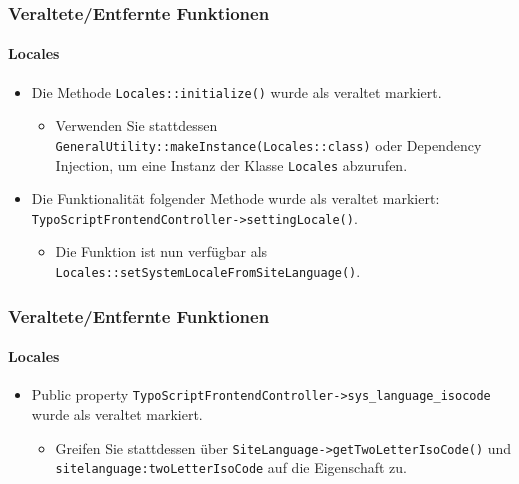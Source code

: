 \begin{frame}[fragile]
	\frametitle{Veraltete/Entfernte Funktionen}
	\framesubtitle{Locales}

	\begin{itemize}
		\item Die Methode \texttt{Locales::initialize()} wurde als veraltet markiert.

			\begin{itemize}\smaller
				\item[\ding{228}] Verwenden Sie stattdessen \texttt{GeneralUtility::makeInstance(Locales::class)} oder
				Dependency Injection, um eine Instanz der Klasse \texttt{Locales} abzurufen.
			\end{itemize}\normalsize

		\item Die Funktionalität folgender Methode wurde als veraltet markiert:\newline
			\texttt{TypoScriptFrontendController->settingLocale()}.

			\begin{itemize}\smaller
				\item[\ding{228}] Die Funktion ist nun verfügbar als
				{\fontsize{8}{8} \selectfont \texttt{Locales::setSystemLocaleFromSiteLanguage()}.}
			\end{itemize}\normalsize

	\end{itemize}

\end{frame}


\begin{frame}[fragile]
	\frametitle{Veraltete/Entfernte Funktionen}
	\framesubtitle{Locales}

	\begin{itemize}
		\item Public property \texttt{TypoScriptFrontendController->sys\_language\_isocode}
			wurde als veraltet markiert.

			\begin{itemize}\smaller
				\item[\ding{228}] Greifen Sie stattdessen über \texttt{SiteLanguage->getTwoLetterIsoCode()}
				und \texttt{sitelanguage:twoLetterIsoCode} auf die Eigenschaft zu.
			\end{itemize}\normalsize

	\end{itemize}

\end{frame}

